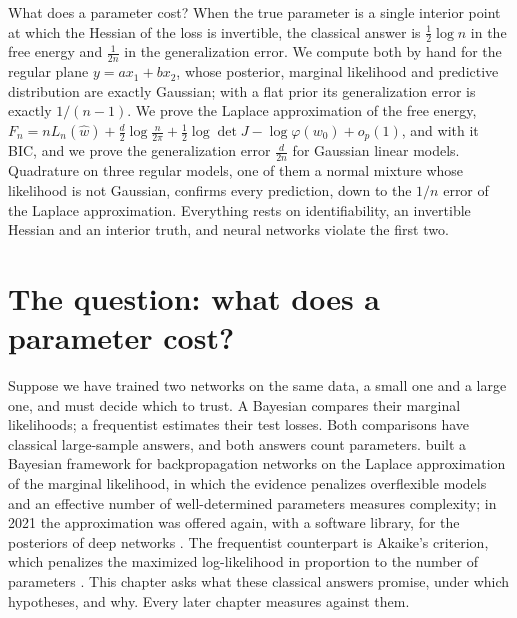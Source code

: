 \begin{refsection}

\begin{chaptersummary}
What does a parameter cost? When the true parameter is a single interior point at which the Hessian of the loss is invertible, the classical answer is $\tfrac12\log n$ in the free energy and $\tfrac1{2n}$ in the generalization error. We compute both by hand for the regular plane $y=ax_1+bx_2$, whose posterior, marginal likelihood and predictive distribution are exactly Gaussian; with a flat prior its generalization error is exactly $1/(n-1)$. We prove the Laplace approximation of the free energy, $F_n=nL_n(\hat w)+\frac d2\log\frac n{2\pi}+\frac12\log\det J-\log\varphi(w_0)+o_p(1)$, and with it BIC, and we prove the generalization error $\frac d{2n}$ for Gaussian linear models. Quadrature on three regular models, one of them a normal mixture whose likelihood is not Gaussian, confirms every prediction, down to the $1/n$ error of the Laplace approximation. Everything rests on identifiability, an invertible Hessian and an interior truth, and neural networks violate the first two.
\end{chaptersummary}

\section{The question: what does a parameter cost?}\label{sec:regular:question}

Suppose we have trained two networks on the same data, a small one and a large one, and must decide which to trust. A Bayesian compares their marginal likelihoods; a frequentist estimates their test losses. Both comparisons have classical large-sample answers, and both answers count parameters. \Textcite{MacKay1992} built a Bayesian framework for backpropagation networks on the Laplace approximation of the marginal likelihood, in which the evidence penalizes overflexible models and an effective number of well-determined parameters measures complexity; in 2021 the approximation was offered again, with a software library, for the posteriors of deep networks \parencite{DaxbergerEtAl2021}. The frequentist counterpart is Akaike's criterion, which penalizes the maximized log-likelihood in proportion to the number of parameters \parencite{Akaike1974}. This chapter asks what these classical answers promise, under which hypotheses, and why. Every later chapter measures against them.


\end{refsection}
